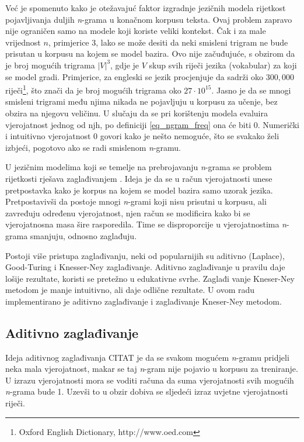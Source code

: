 \documentclass[times, utf8, diplomski, numeric]{fer}
\begin{document}
Već je spomenuto kako je otežavajuć faktor izgradnje jezičnih modela rijetkost pojavljivanja duljih \textit{n}-grama u konačnom korpusu teksta. Ovaj problem zapravo nije ograničen samo na modele koji koriste veliki kontekst. Čak i za male vrijednost $n$, primjerice 3, lako se može desiti da neki smisleni trigram ne bude prisutan u korpusu na kojem se model bazira. Ovo nije začuđujuće, s obzirom da je broj mogućih trigrama $|V|^3$, gdje je $V$ skup svih riječi jezika (vokabular) za koji se model gradi. Primjerice, za engleski se jezik procjenjuje da sadrži oko $300,000$ riječi\footnote{Oxford English Dictionary, http://www.oed.com}, što znači da je broj mogućih trigrama oko $27 \cdot 10^{15}$. Jasno je da se mnogi smisleni trigrami među njima nikada ne pojavljuju u korpusu za učenje, bez obzira na njegovu veličinu. U slučaju da se pri korištenju modela evaluira vjerojatnost jednog od njh, po definiciji \ref{eq_ngram_freq} ona će biti 0. Numerički i intuitivno vjerojatnost 0 govori kako je nešto nemoguće, što se svakako želi izbjeći, pogotovo ako se radi smislenom \textit{n}-gramu.

 U jezičnim modelima koji se temelje na prebrojavanju \textit{n}-grama se problem rijetkosti rješava zaglađivanjem . Ideja je da se u račun vjerojatnosti unese pretpostavka kako je korpus na kojem se model bazira samo uzorak jezika. Pretpostavivši da postoje mnogi \textit{n}-grami koji nisu prisutni u korpusu, ali zavređuju određenu vjerojatnost, njen račun se modificira kako bi se vjerojatnosna masa šire rasporedila. Time se disproporcije u vjerojatnostima \textit{n}-grama smanjuju, odnosno zaglađuju.

Postoji više pristupa zaglađivanju, neki od popularnijih su aditivno (Laplace), Good-Turing i Knesser-Ney zaglađivanje. Aditivno zaglađivanje u pravilu daje lošije rezultate, koristi se pretežno u edukativne svrhe. Zaglađi vanje Kneser-Ney metodom je manje intuitivno, ali daje odlične rezultate. U ovom radu implementirano je aditivno zaglađivanje i zaglađivanje Kneser-Ney metodom.

\subsection{Aditivno zaglađivanje}

Ideja aditivnog zaglađivanja CITAT je da se svakom mogućem \textit{n}-gramu pridjeli neka mala vjerojatnost, makar se taj \textit{n}-gram nije pojavio u korpusu za treniranje. U izrazu vjerojatnosti mora se voditi računa da suma vjerojatnosti svih mogućih \textit{n}-grama bude 1. Uzevši to u obzir dobiva se sljedeći izraz uvjetne vjerojatnosti riječi.
\end{document}
